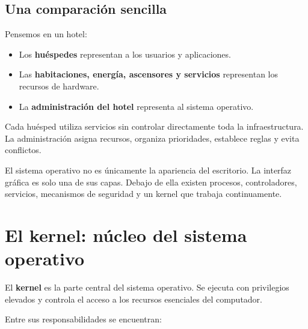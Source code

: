 \documentclass[
  spanish,
  letterpaper,
]{scrbook}
\providecommand{\tightlist}{%
  \setlength{\itemsep}{0pt}\setlength{\parskip}{0pt}}
\begin{document}
\section{Una comparación sencilla}\label{una-comparaciuxf3n-sencilla}

Pensemos en un hotel:

\begin{itemize}
\tightlist
\item
  Los \textbf{huéspedes} representan a los usuarios y aplicaciones.
\item
  Las \textbf{habitaciones, energía, ascensores y servicios} representan
  los recursos de hardware.
\item
  La \textbf{administración del hotel} representa al sistema operativo.
\end{itemize}

Cada huésped utiliza servicios sin controlar directamente toda la
infraestructura. La administración asigna recursos, organiza
prioridades, establece reglas y evita conflictos.

\begin{tcolorbox}[enhanced jigsaw, arc=.35mm, bottomrule=.15mm, bottomtitle=1mm, breakable, colback=white, colbacktitle=quarto-callout-important-color!10!white, colframe=quarto-callout-important-color-frame, coltitle=black, left=2mm, leftrule=.75mm, opacityback=0, opacitybacktitle=0.6, rightrule=.15mm, title=\textcolor{quarto-callout-important-color}{\faExclamation}\hspace{0.5em}{Importante}, titlerule=0mm, toprule=.15mm, toptitle=1mm]

El sistema operativo no es únicamente la apariencia del escritorio. La
interfaz gráfica es solo una de sus capas. Debajo de ella existen
procesos, controladores, servicios, mecanismos de seguridad y un kernel
que trabaja continuamente.

\end{tcolorbox}


\chapter{El kernel: núcleo del sistema
operativo}\label{el-kernel-nuxfacleo-del-sistema-operativo}

El \textbf{kernel} es la parte central del sistema operativo. Se ejecuta
con privilegios elevados y controla el acceso a los recursos esenciales
del computador.

Entre sus responsabilidades se encuentran:
\end{document}
